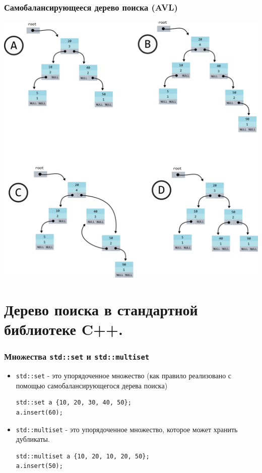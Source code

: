 \documentclass[10pt,pdf,hyperref={unicode}]{beamer}
\begin{document}
\begin{frame}[fragile]
\frametitle{Самобалансирующееся дерево поиска (AVL)}
\begin{center}
\includegraphics[scale=0.4]{images/tree/avl_example.png}
\end{center}
\end{frame}


\section{Дерево поиска в стандартной библиотеке C++.}

\begin{frame}[fragile]
\frametitle{Множества \texttt{std::set} и \texttt{std::multiset}}
\begin{itemize}
\item \texttt{std::set} - это упорядоченное множество (как правило реализовано с помощью самобалансирующегося
дерева поиска)
\begin{lstlisting}
std::set a {10, 20, 30, 40, 50};
a.insert(60);
\end{lstlisting}

\item \texttt{std::multiset} - это упорядоченное множество, которое может хранить дубликаты.
\begin{lstlisting}
std::multiset a {10, 20, 10, 20, 50};
a.insert(50);
\end{lstlisting}
\end{itemize}
\end{frame}
\end{document}

